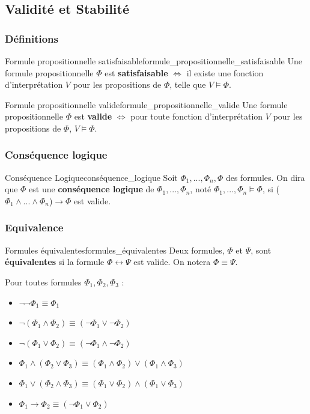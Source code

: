 \documentclass[a4paper, 12pt]{extarticle}
\begin{document}
\subsection{Validité et Stabilité}
\subsubsection{Définitions}
\begin{definition}{Formule propositionnelle satisfaisable}{formule_propositionnelle_satisfaisable}
Une formule propositionnelle $\Phi$ est \textbf{satisfaisable} $\Leftrightarrow$ il existe une fonction d'interprétation $V$ pour les propositions de $\Phi$, telle que 
$V\vDash\Phi$.
\end{definition}
\begin{definition}{Formule propositionnelle valide}{formule_propositionnelle_valide}
Une formule propositionnelle $\Phi$ est \textbf{valide} $\Leftrightarrow$ pour toute fonction d'interprétation $V$ pour les propositions de $\Phi$, $V\vDash\Phi$.
\end{definition}

\subsubsection{Conséquence logique}
\begin{definition}{Conséquence Logique}{conséquence_logique}
Soit $\Phi_1,...,\Phi_n,\Phi$ des formules. On dira que $\Phi$ est une \textbf{conséquence logique} de $\Phi_1,...,\Phi_n$, noté $\Phi_1,...,\Phi_n\vDash\Phi$, si ($\Phi_1\land ...\land\Phi_n$)$\rightarrow\Phi$ est valide.
\end{definition}

\subsubsection{Equivalence}

\begin{definition}{Formules équivalentes}{formules_équivalentes}
Deux formules, $\Phi$ et $\Psi$, sont \textbf{équivalentes} si la formule $\Phi\leftrightarrow\Psi$ est valide. On notera $\Phi\equiv\Psi$.
\end{definition}
Pour toutes formules $\Phi_1,\Phi_2,\Phi_3$ :
\begin{itemize}[label=$\bullet$]
  \item $\neg\neg\Phi_1\equiv\Phi_1$
  \item $\neg(\Phi_1\land\Phi_2)\equiv(\neg\Phi_1\lor\neg\Phi_2)$
  \item $\neg(\Phi_1\lor\Phi_2)\equiv(\neg\Phi_1\land\neg\Phi_2)$
  \item $\Phi_1\land(\Phi_2\lor\Phi_3)\equiv(\Phi_1\land\Phi_2)\lor(\Phi_1\land\Phi_3)$
  \item $\Phi_1\lor(\Phi_2\land\Phi_3)\equiv(\Phi_1\lor\Phi_2)\land(\Phi_1\lor\Phi_3)$
  \item $\Phi_1\rightarrow\Phi_2\equiv(\neg\Phi_1\lor\Phi_2)$
\end{itemize}
\end{document}
